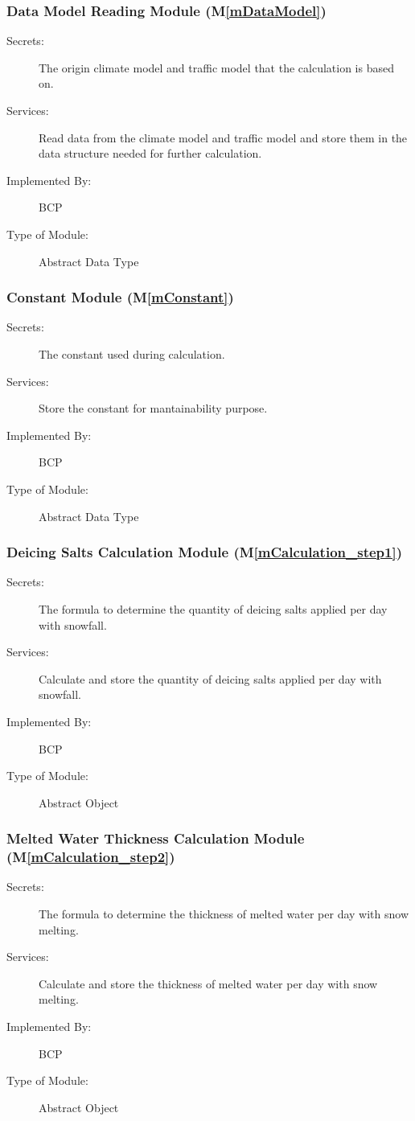 \documentclass[12pt, titlepage]{article}
\newcommand{\mref}[1]{M\ref{#1}}
\begin{document}
\subsubsection{Data Model Reading Module (\mref{mDataModel})}
\begin{description}
\item[Secrets:] The origin climate model and traffic model that the calculation is based on.
\item[Services:]  Read data from the climate model and traffic model and store them in the data structure needed for further calculation.
\item[Implemented By:] BCP
\item[Type of Module:] Abstract Data Type
\end{description}


\subsubsection{Constant Module (\mref{mConstant})}
\begin{description}
\item[Secrets:] The constant used during calculation.
\item[Services:] Store the constant for mantainability purpose.
\item[Implemented By:] BCP
\item[Type of Module:] Abstract Data Type
\end{description}

\subsubsection{Deicing Salts Calculation Module (\mref{mCalculation_step1})}
\begin{description}
\item[Secrets:] The formula to determine the quantity of deicing salts applied per day with snowfall.
\item[Services:] Calculate and store the quantity of deicing salts applied per day with snowfall.
\item[Implemented By:] BCP
\item[Type of Module:] Abstract Object
\end{description}

\subsubsection{Melted Water Thickness Calculation Module (\mref{mCalculation_step2})}
\begin{description}
\item[Secrets:] The formula to determine the thickness of melted water per day with snow melting.
\item[Services:] Calculate and store the thickness of melted water per day with snow melting.
\item[Implemented By:] BCP
\item[Type of Module:] Abstract Object
\end{description}
\end{document}
